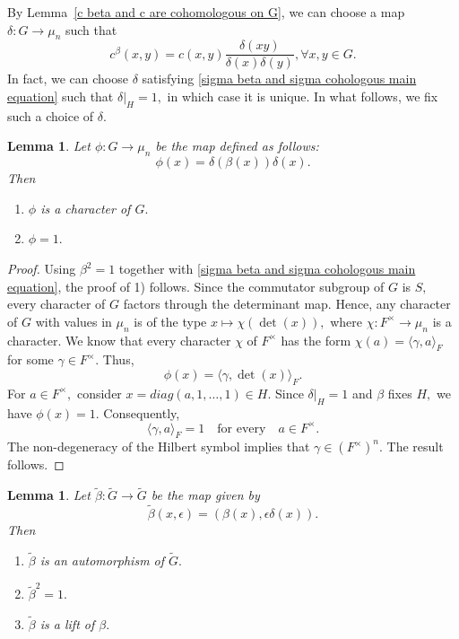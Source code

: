 \documentclass[11pt, a4paper, reqno]{amsart}
\newtheorem{lemma}[theorem]{Lemma}
\theoremstyle{definition}
\theoremstyle{remark}
\theoremstyle{example}
\theoremstyle{note}
\numberwithin{equation}{section}
\begin{document}
    
 
By Lemma~\ref{c beta and c are cohomologous on G}, we can choose a map $\delta:G \to \mu_n$ such that  
\begin{equation}\label{sigma beta and sigma cohologous main equation}
c^{\beta}(x, y) =c(x, y) \frac{\delta(xy)}{\delta(x) \delta(y)}, \forall x, y \in G.
\end{equation}
In fact, we can choose $\delta$ satisfying \eqref{sigma beta and sigma cohologous main equation} such that $\delta|_{H} =1,$ in which case it is unique. In what follows, we fix such a choice of $\delta.$


\begin{lemma}\label{to show beta tilde is an involution}
    Let $\phi:G \to \mu_n$ be the map defined as follows:
    $$\phi(x) = \delta(\beta(x)) \delta(x).$$ Then
    \begin{enumerate}[label=\emph{\arabic*)}]
        \item $\phi$ is a character of $G.$
\vspace{0.1 cm}
        \item $\phi =1.$
    \end{enumerate}
\end{lemma}

\begin{proof}
Using $\beta^{2} =1$ together with \eqref{sigma beta and sigma cohologous main equation}, the proof of 1) follows. Since the commutator subgroup of $G$ is $S,$ every character of $G$ factors through the determinant map. Hence, any character of $G$ with values in $\mu_n$ is of the type $x \mapsto \chi(\det(x)),$ where $\chi:F^\times \to \mu_n$ is a character. We know that every character $\chi$ of $F^\times$ has the form $\chi(a) = \langle \gamma, a \rangle_F$ for some $\gamma \in F^\times.$ Thus, $$\phi(x) = \langle \gamma, \det(x) \rangle_F.$$ For $a \in F^\times,$ consider $x = diag(a,1, \dots, 1) \in H.$ Since $\delta|_{H} =1$ and $\beta$ fixes $H,$ we have  $\phi(x) = 1.$ Consequently, 
$$\langle \gamma, a \rangle_F =1 \quad \text{for every} \quad a \in F^\times.$$ 
The non-degeneracy of the Hilbert symbol implies that  $ \gamma \in (F^{\times})^n.$ The result follows.
\end{proof}


\begin{lemma}\label{lift of the automorphism beta} Let $\tilde{\beta}: \widetilde{G} \to \widetilde{G}$ be the map given by 
\begin{equation*}\label{definition of tilde beta}   
\tilde{\beta} (x, \epsilon) = (\beta(x), \epsilon \delta(x)).\end{equation*} Then
\begin{enumerate}[label=\emph{\arabic*)}]
    \item $\tilde{\beta}$ is an automorphism of $\widetilde{G}.$
\vspace{0.1 cm}
    \item $\tilde{\beta}^2 =1.$ 
\vspace{0.1 cm}
    \item $\tilde{\beta}$ is a lift of $\beta.$
\end{enumerate}
\end{lemma}
\end{document}
